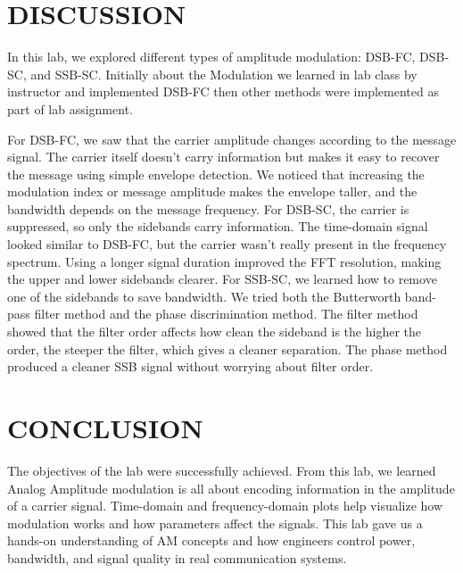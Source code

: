 \newpage
\section*{DISCUSSION}
In this lab, we explored different types of amplitude modulation: DSB-FC, DSB-SC, and SSB-SC. Initially about the Modulation we learned in lab class by instructor and implemented DSB-FC then other methods were implemented as part of lab assignment. 

For DSB-FC, we saw that the carrier amplitude changes according to the message signal. The carrier itself doesn't carry information but makes it easy to recover the message using simple envelope detection. We noticed that increasing the modulation index or message amplitude makes the envelope taller, and the bandwidth depends on the message frequency.
For DSB-SC, the carrier is suppressed, so only the sidebands carry information. The time-domain signal looked similar to DSB-FC, but the carrier wasn't really present in the frequency spectrum. Using a longer signal duration improved the FFT resolution, making the upper and lower sidebands clearer. For SSB-SC, we learned how to remove one of the sidebands to save bandwidth. We tried both the Butterworth band-pass filter method and the phase discrimination method. The filter method showed that the filter order affects how clean the sideband is the higher the order, the steeper the filter, which gives a cleaner separation. The phase method produced a cleaner SSB signal without worrying about filter order.


\section*{CONCLUSION}
The objectives of the lab were successfully achieved. From this lab, we learned Analog Amplitude modulation is all about encoding information in the amplitude of a carrier signal. Time-domain and frequency-domain plots help visualize how modulation works and how parameters affect the signals. This lab gave us a hands-on understanding of AM concepts and how engineers control power, bandwidth, and signal quality in real communication systems.
